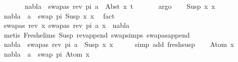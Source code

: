 \begin{isabellebody}
\ \isanewline
\ \ \isamarkupfalse%
\ \isamarkupfalse%
\ {\isachardoublequoteopen}nabla\ {\isasymturnstile}\ swapas\ {\isacharparenleft}{\kern0pt}rev\ pi{\isacharparenright}{\kern0pt}\ a\ {\isasymsharp}\ Abst\ x{}\ t{\isachardoublequoteclose}\ \isanewline
\ \ \ \ \isamarkupfalse%
\ argo\isanewline
{}\isamarkupfalse%
\isanewline
\ \ \isamarkupfalse%
\ {\isacharparenleft}{\kern0pt}Susp\ x{}\ x{}{\isacharparenright}{\kern0pt}\isanewline
\ \ \isamarkupfalse%
\ {\isachardoublequoteopen}nabla\ {\isasymturnstile}\ a\ {\isasymsharp}\ swap\ pi\ {\isacharparenleft}{\kern0pt}Susp\ x{}\ x{}{\isacharparenright}{\kern0pt}{\isachardoublequoteclose}\ \isamarkupfalse%
\ fact\isanewline
\ \ \isamarkupfalse%
\ {\isachardoublequoteopen}{\isacharparenleft}{\kern0pt}swapas\ {\isacharparenleft}{\kern0pt}rev\ x{}{\isacharparenright}{\kern0pt}\ {\isacharparenleft}{\kern0pt}swapas\ {\isacharparenleft}{\kern0pt}rev\ pi{\isacharparenright}{\kern0pt}\ a{\isacharparenright}{\kern0pt}{\isacharcomma}{\kern0pt}\ x{}{\isacharparenright}{\kern0pt}\ {\isasymin}\ nabla{\isachardoublequoteclose}\isanewline
\ \ \ \ \isamarkupfalse%
\ {\isacharparenleft}{\kern0pt}metis\ Fresh{\isacharunderscore}{\kern0pt}elims{\isacharparenleft}{\kern0pt}{}{\isacharparenright}{\kern0pt}\ Susp\ rev{\isacharunderscore}{\kern0pt}append\ swap{\isachardot}{\kern0pt}simps{\isacharparenleft}{\kern0pt}{}{\isacharparenright}{\kern0pt}\ swapas{\isacharunderscore}{\kern0pt}append{\isacharparenright}{\kern0pt}\ \isanewline
\ \ \isamarkupfalse%
\ \isamarkupfalse%
\ {\isachardoublequoteopen}nabla\ {\isasymturnstile}\ swapas\ {\isacharparenleft}{\kern0pt}rev\ pi{\isacharparenright}{\kern0pt}\ a\ {\isasymsharp}\ Susp\ x{}\ x{}{\isachardoublequoteclose}\isanewline
\ \ \ \ \isamarkupfalse%
\ {\isacharparenleft}{\kern0pt}simp\ add{\isacharcolon}{\kern0pt}\ fresh{\isacharunderscore}{\kern0pt}susp{\isacharparenright}{\kern0pt}\isanewline
{}\isamarkupfalse%
\isanewline
\ \ \isamarkupfalse%
\ {\isacharparenleft}{\kern0pt}Atom\ x{\isacharparenright}{\kern0pt}\isanewline
\ \ \isamarkupfalse%
\ {\isachardoublequoteopen}nabla\ {\isasymturnstile}\ a\ {\isasymsharp}\ swap\ pi\ {\isacharparenleft}{\kern0pt}Atom\ x{\isacharparenright}{\kern0pt}{\isachardoublequoteclose}\ \isamarkupfalse%

\end{isabellebody}
